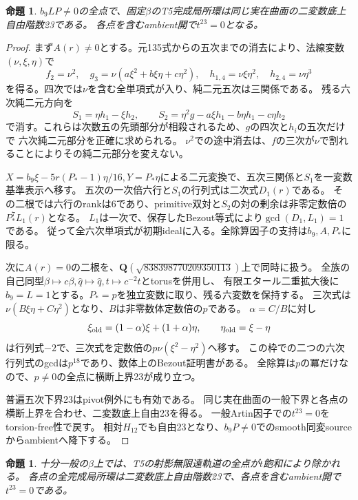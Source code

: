 \documentclass[11pt,a4paper]{ltjsarticle}
\newcommand{\QQ}{\mathbf Q}
\newtheorem{proposition}[theorem]{命題}
\theoremstyle{remark}
\begin{document}
\begin{proposition}
$b_9LP\ne0$の全点で、固定$\beta$のT5完成局所環は同じ実在曲面の二変数底上自由階数23である。
各点を含むambient開で$t^{23}=0$となる。
\end{proposition}
\begin{proof}
まず$A(r)\ne0$とする。元135式からの五次までの消去により、法線変数$(\nu,\xi,\eta)$で
\[
 f_2=\nu^2,\quad g_3=\nu(a\xi^2+b\xi\eta+c\eta^2),\quad
 h_{1,4}=\nu\xi\eta^2,\quad h_{2,4}=\nu\eta^3
\]
を得る。四次では$\nu$を含む全単項式が入り、純二元五次は三関係である。
残る六次純二元方向を
\[
 S_1=\eta h_1-\xi h_2,\qquad
 S_2=\eta^2g-a\xi h_1-b\eta h_1-c\eta h_2
\]
で消す。これらは次数五の先頭部分が相殺されるため、$g$の四次と$h_i$の五次だけで
六次純二元部分を正確に求められる。
$\nu^2$での途中消去は、$f$の三次が$\nu$で割れることによりその純二元部分を変えない。

$X=b_9\xi-5r(P_*-1)\eta/16,Y=P_*\eta$による二元変換で、五次三関係と$S_1$を一変数基準表示へ移す。
五次の一次倍六行と$S_1$の行列式は二次式$D_1(r)$である。
その二根では六行のrankは6であり、primitive双対と$S_2$の対の剰余は非零定数倍の$P_*^7L_1(r)$となる。
$L_1$は一次で、保存したBezout等式により$\gcd(D_1,L_1)=1$である。
従って全六次単項式が初期idealに入る。全除算因子の支持は$b_9,A,P_*$に限る\cite{t5-open-v44}。

次に$A(r)=0$の二根を、$\QQ(\sqrt{838398770209350113})$上で同時に扱う。
全族の自己同型$\beta\mapsto c\beta,\widehat q\mapsto\widehat q,t\mapsto c^{-2}t$とtorusを併用し、
有限エタール二重拡大後に$b_9=L=1$とする。$P_*=p$を独立変数に取り、残る六変数を保持する。
三次式は$\nu(B\xi\eta+C\eta^2)$となり、$B$は非零数体定数倍の$p$である。
$\alpha=C/B$に対し
\[
 \xi_{\rm old}=(1-\alpha)\xi+(1+\alpha)\eta,\qquad \eta_{\rm old}=\xi-\eta
\]
は行列式$-2$で、三次式を定数倍の$p\nu(\xi^2-\eta^2)$へ移す。
この枠での二つの六次行列式のgcdは$p^{18}$であり、数体上のBezout証明書がある。
全除算は$p$の冪だけなので、$p\ne0$の全点に横断上界23が成り立つ\cite{t5-aq-v44}。

普遍五次下界23はpivot例外にも有効である。
同じ実在曲面の一般下界と各点の横断上界を合わせ、二変数底上自由23を得る。
一般Artin因子での$t^{23}=0$をtorsion-free性で戻す。
相対$H_{12}$でも自由23となり、$b_9P\ne0$でのsmooth同変sourceからambientへ降下する。
\end{proof}
\begin{proposition}
十分一般の$\beta$上では、T5の射影無限遠軌道の全点が$t$飽和により除かれる。
各点の全完成局所環は二変数底上自由階数23で、各点を含むambient開で$t^{23}=0$である。
\end{proposition}
\end{document}
